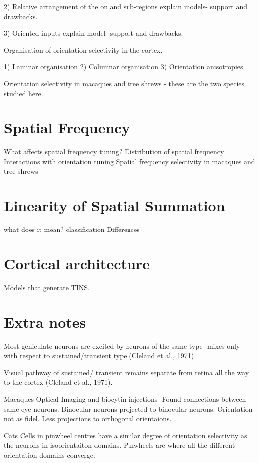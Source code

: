 2) Relative arrangement of the on and sub-regions
explain models- support and drawbacks.

3) Oriented inputs
explain model- support and drawbacks.


Organisation of orientation selectivity in the cortex.

1) Laminar organisation
2) Columnar organisation
3) Orientation anisotropies

Orientation selectivity in macaques and tree shrews - these are the two species studied here.


\section{Spatial Frequency}

What affects spatial frequency tuning?
Distribution of spatial frequency
Interactions with orientation tuning
Spatial frequency selectivity in macaques and tree shrews

\section{Linearity of Spatial Summation}

what does it mean?
classification
Differences

\section{Cortical architecture}

Models that generate
TINS.

\section{Extra notes}
Most geniculate neurons are excited by neurons of the same type- mixes only with respect to sustained/transient type (Cleland et al., 1971)

Visual pathway of sustained/ transient remains separate from retina all the way to the cortex (Cleland et al., 1971).

\cite{Malach1993} Macaques Optical Imaging and biocytin injections- Found connections between same eye neurons. Binocular neurons projected to binocular neurons. Orientation not as fidel. Less projections to orthogonal orientaions.

\cite{Maldonado1997} Cats Cells in pinwheel centres have a similar degree of orientation selectivity as the neurons in isoorientaiton domains. Pinwheels are where all the different orientation domains converge.

